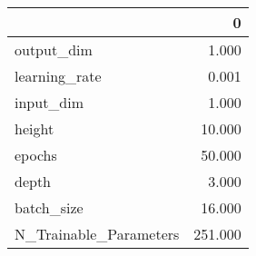 \begin{tabular}{lr}
\toprule
{} &        0 \\
\midrule
output\_dim             &    1.000 \\
learning\_rate          &    0.001 \\
input\_dim              &    1.000 \\
height                 &   10.000 \\
epochs                 &   50.000 \\
depth                  &    3.000 \\
batch\_size             &   16.000 \\
N\_Trainable\_Parameters &  251.000 \\
\bottomrule
\end{tabular}
